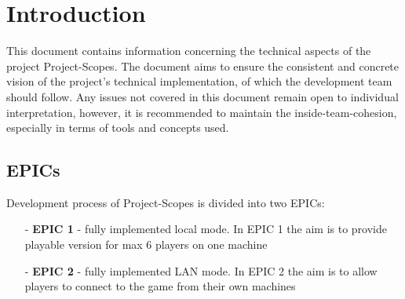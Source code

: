 \section{Introduction}
\noindent This document contains information concerning the technical aspects of the project Project-Scopes. The document aims to ensure the consistent and concrete vision of the project's technical implementation, of which the development team should follow. Any issues not covered in this document remain open to individual interpretation, however, it is recommended to maintain the inside-team-cohesion, especially in terms of tools and concepts used.

\subsection{EPICs}
\noindent Development process of Project-Scopes is divided into two EPICs:
\begin{itemize}
	\item[-] \textbf{EPIC 1} - fully implemented local mode. In EPIC 1 the aim is to provide playable version for max 6 players on one machine
	\item[-] \textbf{EPIC 2} - fully implemented LAN mode. In EPIC 2 the aim is to allow players to connect to the game from their own machines
\end{itemize}